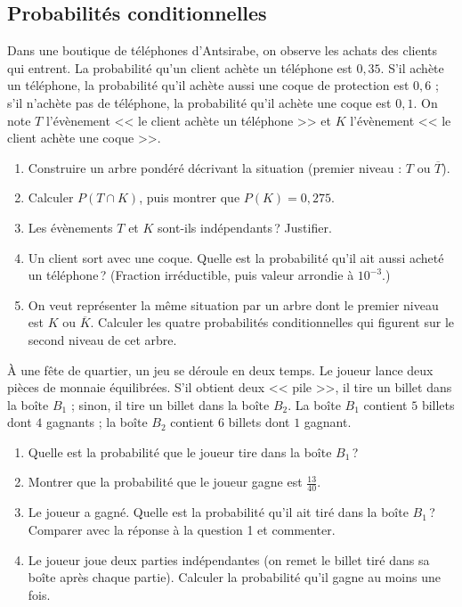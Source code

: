 \subsection*{Probabilit\'es conditionnelles}
\begin{exo}\label{exo:proba-14}
Dans une boutique de t\'el\'ephones d'Antsirabe, on observe les achats des clients qui entrent.
La probabilit\'e qu'un client ach\`ete un t\'el\'ephone est $0,35$.
S'il ach\`ete un t\'el\'ephone, la probabilit\'e qu'il ach\`ete aussi une coque de protection est $0,6$ ;
s'il n'ach\`ete pas de t\'el\'ephone, la probabilit\'e qu'il ach\`ete une coque est $0,1$.
On note $T$ l'\'ev\`enement << le client ach\`ete un t\'el\'ephone >> et $K$ l'\'ev\`enement << le client ach\`ete une coque >>.
\begin{enumerate}
\item Construire un arbre pond\'er\'e d\'ecrivant la situation (premier niveau : $T$ ou $\overline{T}$).
\item Calculer $P(T\cap K)$, puis montrer que $P(K) = 0,275$.
\item Les \'ev\`enements $T$ et $K$ sont-ils ind\'ependants\,? Justifier.
\item Un client sort avec une coque. Quelle est la probabilit\'e qu'il ait aussi achet\'e un t\'el\'ephone\,?
      (Fraction irr\'eductible, puis valeur arrondie \`a $10^{-3}$.)
\item On veut repr\'esenter la m\^eme situation par un arbre dont le premier niveau est $K$ ou $\overline{K}$.
      Calculer les quatre probabilit\'es conditionnelles qui figurent sur le second niveau de cet arbre.
\end{enumerate}
\end{exo}
%
\begin{exo}\label{exo:proba-15}
\`A une f\^ete de quartier, un jeu se d\'eroule en deux temps.
Le joueur lance deux pi\`eces de monnaie \'equilibr\'ees.
S'il obtient deux << pile >>, il tire un billet dans la bo\^ite $B_1$ ;
sinon, il tire un billet dans la bo\^ite $B_2$.
La bo\^ite $B_1$ contient $5$ billets dont $4$ gagnants ; la bo\^ite $B_2$ contient $6$ billets dont $1$ gagnant.
\begin{enumerate}
\item Quelle est la probabilit\'e que le joueur tire dans la bo\^ite $B_1$\,?
\item Montrer que la probabilit\'e que le joueur gagne est $\frac{13}{40}$.
\item Le joueur a gagn\'e. Quelle est la probabilit\'e qu'il ait tir\'e dans la bo\^ite $B_1$\,?
      Comparer avec la r\'eponse \`a la question 1 et commenter.
\item Le joueur joue deux parties ind\'ependantes (on remet le billet tir\'e dans sa bo\^ite apr\`es chaque partie).
      Calculer la probabilit\'e qu'il gagne au moins une fois.
\end{enumerate}
\end{exo}
